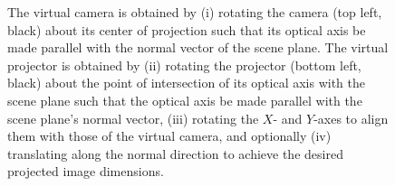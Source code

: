 \documentclass[review]{elsarticle}
\begin{document}
\begin{figure}
    \centering
    \qquad
    \caption{The virtual camera is obtained by (i) rotating the camera (top left, black) about its center of projection such that its optical axis be made parallel with the normal vector of the scene plane. The virtual projector is obtained by (ii) rotating the projector (bottom left, black) about the point of intersection of its optical axis with the scene plane such that the optical axis be made parallel with the scene plane's normal vector, (iii) rotating the $X$- and $Y$-axes to align them with those of the virtual camera, and optionally (iv) translating along the normal direction to achieve the desired projected image dimensions.} %
    \label{fig:virtualproj}
\end{figure}
\end{document}
